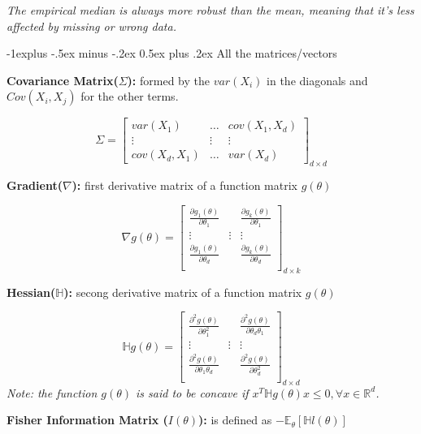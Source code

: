 \documentclass[9pt,landscape]{article}
\makeatletter
\renewcommand{\subsection}{\@startsection{subsection}{2}{0mm}%
                                {-1explus -.5ex minus -.2ex}%
                                {0.5ex plus .2ex}%
                                {\normalfont\normalsize\bfseries}}
\makeatother
\begin{document}
\begin{multicols}{3}
\textit{The empirical median is always more robust than the mean, meaning that it's less affected by missing or wrong data.}

\subsection{All the matrices/vectors}

\textbf{Covariance Matrix($\Sigma$):} formed by the $var(X_i)$ in the diagonals and $Cov(X_i, X_j)$ for the other terms.

$$\Sigma = 
\left[
\begin{array}{ccc}
    var(X_1) & \ldots & cov(X_1, X_d)\\
    \vdots & \vdots & \vdots\\
    cov(X_d, X_1) & \ldots & var(X_d)
\end{array}
\right]_{d \times d}
$$

\textbf{Gradient($\nabla$):} first derivative matrix of a function matrix $g(\theta)$

$$\nabla g(\theta) = 
\left[
\begin{array}{ccc}
    \frac{\partial g_1(\theta)}{\partial \theta_1}& &\frac{\partial g_k(\theta)}{\partial \theta_1}\\
    \vdots& \vdots & \vdots\\
    \frac{\partial g_1(\theta)}{\partial \theta_d}& &\frac{\partial g_k(\theta)}{\partial \theta_d}\\
\end{array}
\right]_{d \times k}
$$

\textbf{Hessian($\mathbb{H}$):} secong derivative matrix of a function matrix $g(\theta)$

$$\mathbb{H} g(\theta) = 
\left[
\begin{array}{ccc}
    \frac{\partial^2 g(\theta)}{\partial \theta_1^2}& &\frac{\partial^2 g(\theta)}{\partial \theta_d \theta_1}\\
    \vdots& \vdots & \vdots\\
    \frac{\partial^2 g(\theta)}{\partial \theta_1 \theta_d}& &\frac{\partial^2 g(\theta)}{\partial \theta_d^2}\\
\end{array}
\right]_{d \times d}
$$
\textit{Note: the function $g(\theta)$ is said to be concave if $x^T \mathbb{H}g(\theta)x \leq 0, \forall x \in \mathbb{R}^d$.}


\textbf{Fisher Information Matrix ($I(\theta)$):} is defined as $-\mathbb{E}_\theta [\mathbb{H}l(\theta)]$


\end{multicols}
\end{document}
